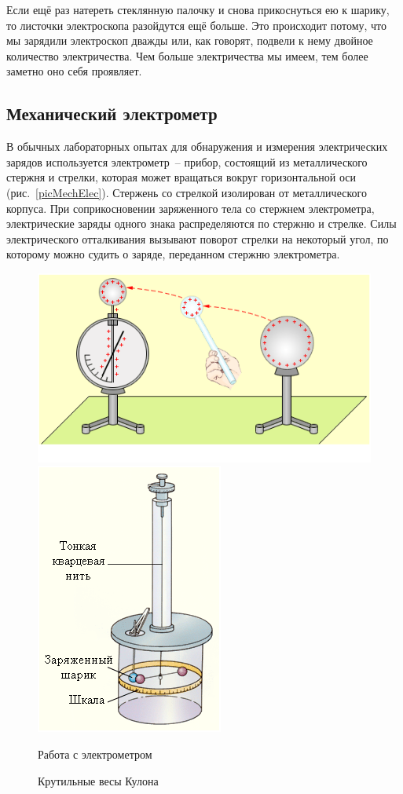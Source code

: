 \documentclass[pscyr]{hedwork}
\begin{document}
  Если ещё раз натереть стеклянную палочку и снова прикоснуться ею к шарику, то
  листочки электроскопа разойдутся ещё больше. Это происходит потому, что мы
  зарядили электроскоп дважды или, как говорят, подвели к нему двойное
  количество электричества. Чем больше электричества мы имеем, тем более заметно
  оно себя проявляет.

  \subsection{Механический электрометр}
  В обычных лабораторных опытах для обнаружения и измерения электрических
  зарядов используется электрометр~-- прибор, состоящий из металлического
  стержня и стрелки, которая может вращаться вокруг горизонтальной оси
  (рис.~\ref{picMechElec}). Стержень со стрелкой изолирован от металлического
  корпуса. При соприкосновении заряженного тела со стержнем электрометра,
  электрические заряды одного знака распределяются по стержню и стрелке. Силы
  электрического отталкивания вызывают поворот стрелки на некоторый угол, по
  которому можно судить о заряде, переданном стержню электрометра.

  \begin{figure}[ht]
    \center
    \includegraphics[width=.65\textwidth]{sl_2_1} \hspace{1em}
    \includegraphics[width=.3\textwidth]{sl_2_2} \\
    \parbox{.65\textwidth}{\caption{Работа с электрометром} \label{picMechElec}}
    \hspace{1em}
    \parbox{.3\textwidth}{\caption{Крутильные весы Кулона} \label{picScales}}
  \end{figure}
\end{document}
